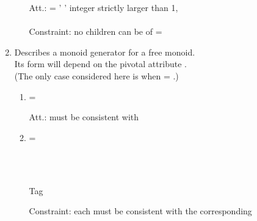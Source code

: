\begin{enumerate}
\begin{enumerate}
\smallskip
\begin{tabbing}
\ptn Att.:  = ' '   \tagsp   integer strictly larger 
than 1, \req\\
~\\
\trt Constraint: no children   can be of  = 
\end{tabbing}

\end{enumerate}

 

\item {}

Describes a monoid generator for a free monoid.\\
Its form will depend on the pivotal attribute  .\\
(The only case considered here is when   = .)

\begin{enumerate}

\item  {} = 

\begin{tabbing}
\end{tabbing}

\begin{tabbing}
\ptn Att.:  \tagsp must be consistent with  \req
\end{tabbing}

\item  {} = 

\begin{tabbing}
 \\[\taglnskp]
\tagindent{}\tagsp{} \occ \req \\[\taglnskp]
\end{tabbing}

\begin{tabbing}
\ptn Tag 
\end{tabbing}

\trt Constraint: each  must be consistent with the
corresponding 

\end{enumerate}

\end{enumerate}
\setcounter{enumitemp}{\value{enumi}}

